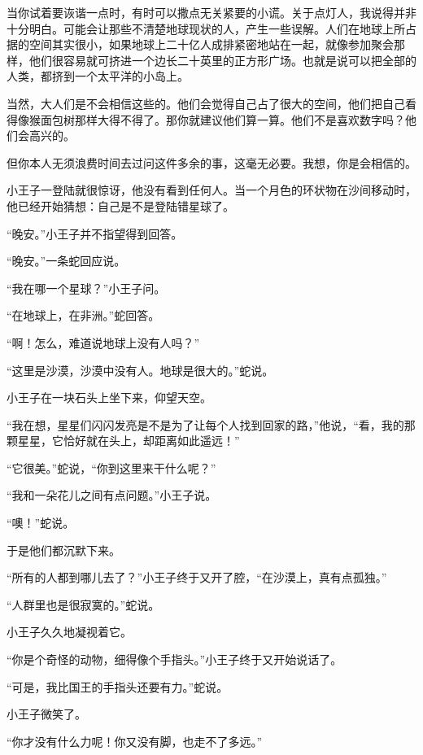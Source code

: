 \stoptitle

\starttitle[title={17}]

当你试着要诙谐一点时，有时可以撒点无关紧要的小谎。关于点灯人，我说得并非十分明白。可能会让那些不清楚地球现状的人，产生一些误解。人们在地球上所占据的空间其实很小，如果地球上二十亿人成排紧密地站在一起，就像参加聚会那样，他们很容易就可挤进一个边长二十英里的正方形广场。也就是说可以把全部的人类，都挤到一个太平洋的小岛上。

当然，大人们是不会相信这些的。他们会觉得自己占了很大的空间，他们把自己看得像猴面包树那样大得不得了。那你就建议他们算一算。他们不是喜欢数字吗？他们会高兴的。

但你本人无须浪费时间去过问这件多余的事，这毫无必要。我想，你是会相信的。

小王子一登陆就很惊讶，他没有看到任何人。当一个月色的环状物在沙间移动时，他已经开始猜想：自己是不是登陆错星球了。

“晚安。”小王子并不指望得到回答。

“晚安。”一条蛇回应说。

“我在哪一个星球？”小王子问。

“在地球上，在非洲。”蛇回答。

“啊！怎么，难道说地球上没有人吗？”

“这里是沙漠，沙漠中没有人。地球是很大的。”蛇说。

小王子在一块石头上坐下来，仰望天空。

“我在想，星星们闪闪发亮是不是为了让每个人找到回家的路，”他说，“看，我的那颗星星，它恰好就在头上，却距离如此遥远！”

“它很美。”蛇说，“你到这里来干什么呢？”

“我和一朵花儿之间有点问题。”小王子说。

“噢！”蛇说。

于是他们都沉默下来。

“所有的人都到哪儿去了？”小王子终于又开了腔，“在沙漠上，真有点孤独。”

“人群里也是很寂寞的。”蛇说。

小王子久久地凝视着它。

“你是个奇怪的动物，细得像个手指头。”小王子终于又开始说话了。

“可是，我比国王的手指头还要有力。”蛇说。

小王子微笑了。

{\startalignment[center]
 \stopalignment}

“你才没有什么力呢！你又没有脚，也走不了多远。”


